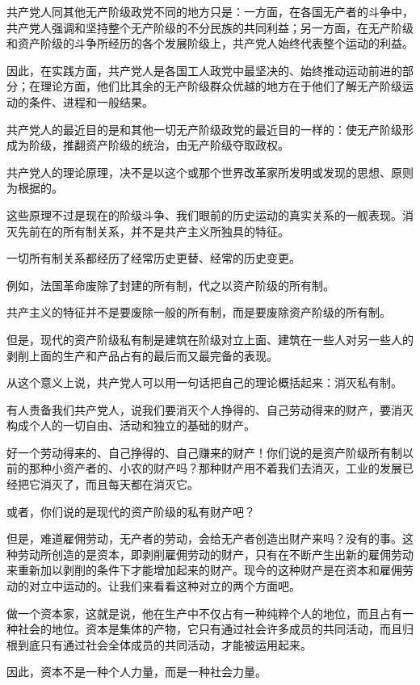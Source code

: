 \documentclass[UTF8]{ctexart}
\begin{document}
共产党人同其他无产阶级政党不同的地方只是：一方面，在各国无产者的斗争中，共产党人强调和坚持整个无产阶级的不分民族的共同利益；另一方面，在无产阶级和资产阶级的斗争所经历的各个发展阶级上，共产党人始终代表整个运动的利益。

因此，在实践方面，共产党人是各国工人政党中最坚决的、始终推动运动前进的部分；在理论方面，他们比其余的无产阶级群众优越的地方在于他们了解无产阶级运动的条件、进程和一般结果。

共产党人的最近目的是和其他一切无产阶级政党的最近目的一样的：使无产阶级形成为阶级，推翻资产阶级的统治，由无产阶级夺取政权。

共产党人的理论原理，决不是以这个或那个世界改革家所发明或发现的思想、原则为根据的。

这些原理不过是现在的阶级斗争、我们眼前的历史运动的真实关系的一舰表现。消灭先前在的所有制关系，并不是共产主义所独具的特征。

一切所有制关系都经历了经常历史更替、经常的历史变更。

例如，法国革命废除了封建的所有制，代之以资产阶级的所有制。

共产主义的特征并不是要废除一般的所有制，而是要废除资产阶级的所有制。

但是，现代的资产阶级私有制是建筑在阶级对立上面、建筑在一些人对另一些人的剥削上面的生产和产品占有的最后而又最完备的表现。

从这个意义上说，共产党人可以用一句话把自己的理论概括起来：消灭私有制。

有人责备我们共产党人，说我们要消灭个人挣得的、自己劳动得来的财产，要消灭构成个人的一切自由、活动和独立的基础的财产。

好一个劳动得来的、自己挣得的、自己赚来的财产！你们说的是资产阶级所有制以前的那种小资产者的、小农的财产吗？那种财产用不着我们去消灭，工业的发展已经把它消灭了，而且每天都在消灭它。

或者，你们说的是现代的资产阶级的私有财产吧？

但是，难道雇佣劳动，无产者的劳动，会给无产者创造出财产来吗？没有的事。这种劳动所创造的是资本，即剥削雇佣劳动的财产，只有在不断产生出新的雇佣劳动来重新加以剥削的条件下才能增加起来的财产。现今的这种财产是在资本和雇佣劳动的对立中运动的。让我们来看看这种对立的两个方面吧。

做一个资本家，这就是说，他在生产中不仅占有一种纯粹个人的地位，而且占有一种社会的地位。资本是集体的产物，它只有通过社会许多成员的共同活动，而且归根到底只有通过社会全体成员的共同活动，才能被运用起来。

因此，资本不是一种个人力量，而是一种社会力量。
\end{document}
